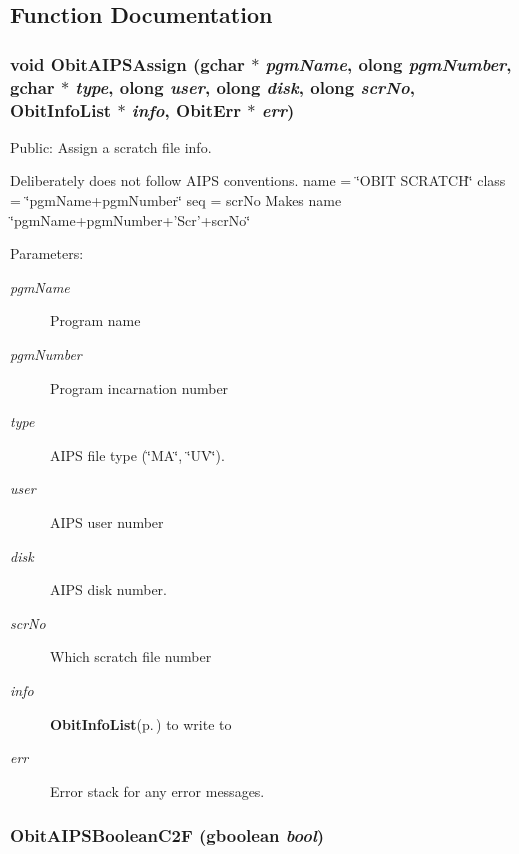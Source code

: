 \subsection{Function Documentation}
\subsubsection{\setlength{\rightskip}{0pt plus 5cm}void Obit\-AIPSAssign (gchar $\ast$ {\em pgm\-Name}, {\bf olong} {\em pgm\-Number}, gchar $\ast$ {\em type}, {\bf olong} {\em user}, {\bf olong} {\em disk}, {\bf olong} {\em scr\-No}, {\bf Obit\-Info\-List} $\ast$ {\em info}, {\bf Obit\-Err} $\ast$ {\em err})}\label{ObitAIPS_8h_a23}


Public: Assign a scratch file info. 

Deliberately does not follow AIPS conventions. name = \char`\"{}OBIT SCRATCH\char`\"{} class = \char`\"{}pgm\-Name+pgm\-Number\char`\"{} seq = scr\-No Makes name \char`\"{}pgm\-Name+pgm\-Number+'Scr'+scr\-No\char`\"{} \begin{Desc}
\item[Parameters:]
\begin{description}
\item[{\em pgm\-Name}]Program name \item[{\em pgm\-Number}]Program incarnation number \item[{\em type}]AIPS file type (\char`\"{}MA\char`\"{}, \char`\"{}UV\char`\"{}). \item[{\em user}]AIPS user number \item[{\em disk}]AIPS disk number. \item[{\em scr\-No}]Which scratch file number \item[{\em info}]{\bf Obit\-Info\-List}{\rm (p.\,\pageref{structObitInfoList})} to write to \item[{\em err}]Error stack for any error messages. \end{description}
\end{Desc}
\subsubsection{ Obit\-AIPSBoolean\-C2F (gboolean {\em bool})}\label{ObitAIPS_8h_a26}


